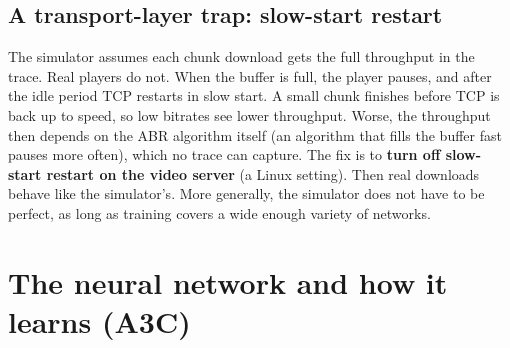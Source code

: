 \subsection{A transport-layer trap: slow-start restart}
The simulator assumes each chunk download gets the full throughput in the trace. Real players do not. When the buffer is full, the player pauses, and
after the idle period TCP restarts in slow start. A small chunk finishes before TCP is back up to speed, so low bitrates see lower throughput. Worse, the
throughput then depends on the ABR algorithm itself (an algorithm that fills the buffer fast pauses more often), which no trace can capture. The fix is
to \textbf{turn off slow-start restart on the video server} (a Linux setting). Then real downloads behave like the simulator's. More generally, the
simulator does not have to be perfect, as long as training covers a wide enough variety of networks.

\section{The neural network and how it learns (A3C)}


